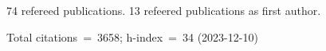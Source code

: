 74 refereed publications. 13 refeered publications as first author.

Total citations~=~3658; h-index~=~34 (2023-12-10)